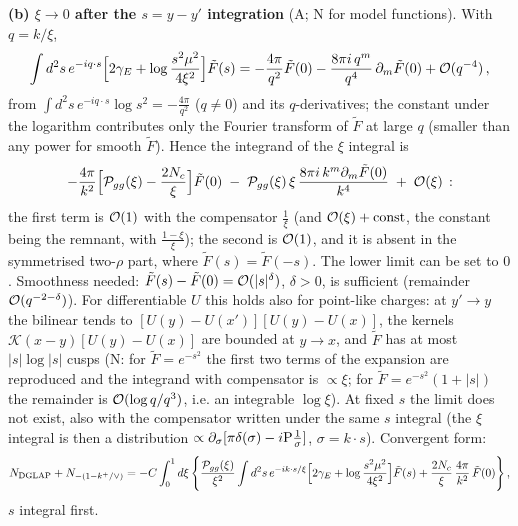 \documentclass[9pt]{article}
\numberwithin{equation}{section}
\begin{document}
\noindent\textbf{(b) $\xi\to0$ after the $s=y-y'$ integration} (A; N for model functions). With $q=k/\xi$,
\begin{align}
\int d^{2}s\,e^{-iq\cdot s}\Big[2\gamma_{E}+\log\frac{s^{2}\mu^{2}}{4\xi^{2}}\Big]\tilde F(s)=-\frac{4\pi}{q^{2}}\tilde F(0)-\frac{8\pi i\,q^{m}}{q^{4}}\,\partial_{m}\tilde F(0)+{\cal O}(q^{-4})\,,\notag
\end{align}
from $\int d^{2}s\,e^{-iq\cdot s}\log s^{2}=-\frac{4\pi}{q^{2}}$ ($q\neq0$) and its $q$-derivatives; the constant under the logarithm contributes only the Fourier transform of $\tilde F$ at large $q$ (smaller than any power for smooth $\tilde F$). Hence the integrand of the $\xi$ integral is
\begin{align}
-\frac{4\pi}{k^{2}}\Big[\mathcal P_{gg}(\xi)-\frac{2N_{c}}{\xi}\Big]\tilde F(0)\;-\;\mathcal P_{gg}(\xi)\,\xi\,\frac{8\pi i\,k^{m}\partial_{m}\tilde F(0)}{k^{4}}\;+\;{\cal O}(\xi)\,:\notag
\end{align}
the first term is ${\cal O}(1)$ with the compensator $\frac1\xi$ (and ${\cal O}(\xi)+{\rm const}$, the constant being the remnant, with $\frac{1-\xi}{\xi}$); the second is ${\cal O}(1)$, and it is absent in the symmetrised two-$\rho$ part, where $\tilde F(s)=\tilde F(-s)$. The lower limit can be set to $0$. Smoothness needed: $\tilde F(s)-\tilde F(0)={\cal O}(|s|^{\delta})$, $\delta>0$, is sufficient (remainder ${\cal O}(q^{-2-\delta})$). For differentiable $U$ this holds also for point-like charges: at $y'\to y$ the bilinear tends to $[U(y)-U(x')][U(y)-U(x)]$, the kernels $\mathcal K(x-y)[U(y)-U(x)]$ are bounded at $y\to x$, and $\tilde F$ has at most $|s|\log|s|$ cusps (N: for $\tilde F=e^{-s^{2}}$ the first two terms of the expansion are reproduced and the integrand with compensator is $\propto\xi$; for $\tilde F=e^{-s^{2}}(1+|s|)$ the remainder is ${\cal O}(\log q/q^{3})$, i.e. an integrable $\log\xi$). At fixed $s$ the limit does not exist, also with the compensator written under the same $s$ integral (the $\xi$ integral is then a distribution $\propto\partial_{\sigma}[\pi\delta(\sigma)-i{\rm P}\frac1\sigma]$, $\sigma=k\cdot s$). Convergent form:
\begin{align}
N_{\rm DGLAP}+N_{-(1-k^{+}/\vee)}=-C\int_{0}^{1}d\xi\,\Bigg\{\frac{\mathcal P_{gg}(\xi)}{\xi^{2}}\int d^{2}s\,e^{-ik\cdot s/\xi}\Big[2\gamma_{E}+\log\frac{s^{2}\mu^{2}}{4\xi^{2}}\Big]\tilde F(s)+\frac{2N_{c}}{\xi}\,\frac{4\pi}{k^{2}}\,\tilde F(0)\Bigg\}\,,\notag
\end{align}
$s$ integral first.
\end{document}
